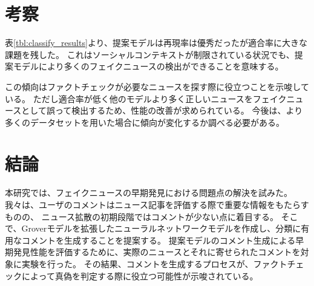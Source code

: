\documentclass[twocolumn, a4paper, uplatex]{UECIEresume}
\begin{document}
\section{考察}



表\ref{tbl:classify_results}より、提案モデルは再現率は優秀だったが適合率に大きな課題を残した。
これはソーシャルコンテキストが制限されている状況でも、提案モデルにより多くのフェイクニュースの検出ができることを意味する。

この傾向はファクトチェックが必要なニュースを探す際に役立つことを示唆している。
ただし適合率が低く他のモデルより多く正しいニュースをフェイクニュースとして誤って検出するため、性能の改善が求められている。
今後は、より多くのデータセットを用いた場合に傾向が変化するか調べる必要がある。


\section{結論}
本研究では、フェイクニュースの早期発見における問題点の解決を試みた。
我々は、ユーザのコメントはニュース記事を評価する際で重要な情報をもたらすものの、
ニュース拡散の初期段階ではコメントが少ない点に着目する。
そこで、Groverモデルを拡張したニューラルネットワークモデルを作成し、分類に有用なコメントを生成することを提案する。
提案モデルのコメント生成による早期発見性能を評価するために、実際のニュースとそれに寄せられたコメントを対象に実験を行った。
その結果、コメントを生成するプロセスが、ファクトチェックによって真偽を判定する際に役立つ可能性が示唆されている。

{\small


}
\end{document}
